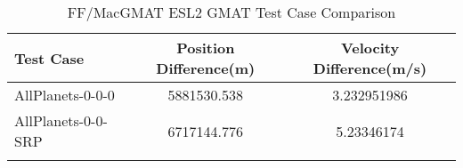 \begin{table}[htbp!]
\centering
\caption{ FF/MacGMAT ESL2 GMAT Test Case Comparison}
      \begin{tabular}{lcc}
      \hline\hline
          Test Case & Position Difference(m) & Velocity Difference(m/s) \\
         \hline
         AllPlanets-0-0-0 & 5881530.538 & 3.232951986 \\
         AllPlanets-0-0-SRP & 6717144.776 & 5.23346174 \\
      \hline\hline
      \label{Table: ESL2 GMAT Table} 
\end{tabular}
\end{table}
